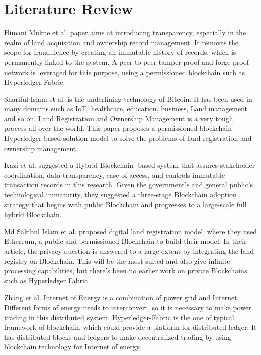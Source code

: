 \documentclass[12pt]{ucthesis}
\begin{document}
\section{Literature Review}
\label{literaturereview}

Himani Mukne et al. \cite{ref15} paper aims at introducing transparency, especially in the realm of land acquisition and ownership record management. It removes the scope for fraudulence by creating an immutable history of records, which is permanently linked to the system. A peer-to-peer tamper-proof and forge-proof network is leveraged for this purpose, using a permissioned blockchain such as Hyperledger Fabric.

Shariful Islam et al.\cite{rf4} is the underlining technology of Bitcoin. It has been used in many domains such as IoT, healthcare, education, business, Land management and so on. Land Registration and Ownership Management is a very tough process all over the world. This paper proposes a permissioned blockchain-Hyperledger based solution model to solve the problems of land registration and ownership management.

Kazi et al.\cite{rf3} suggested a Hybrid Blockchain-
based system that assures stakeholder coordination, data transparency, ease of
access, and controls immutable transaction records in this research. Given the
government’s and general public’s technological immaturity, they suggested a
three-stage Blockchain adoption strategy that begins with public Blockchain and
progresses to a large-scale full hybrid Blockchain. 


Md Sakibul Islam et al.\cite{rf1} proposed digital land registration model, where they
used Ethereum, a public and permissioned Blockchain to build their model. In
their article, the privacy question is answered to a large extent by integrating the
land registry on Blockchain. This will be the most suited and also give infinite
processing capabilities, but there’s been no earlier work on private Blockchains
such as Hyperledger Fabric

Zhang et al. \cite{rf16} Internet of Energy is a combination of power grid and Internet. Different forms of energy needs to interconvert, so it is necessary to make power trading in this distributed system. Hyperledger-Fabric is the one of typical framework of blockchain, which could provide a platform for distributed ledger. It has distributed blocks and ledgers to make decentralized trading by using blockchain technology for Internet of energy.
\end{document}
